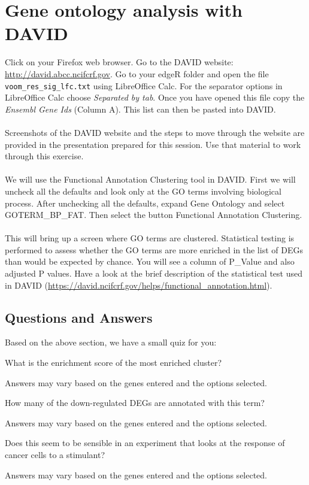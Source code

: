 \section{Gene ontology analysis with DAVID}
Click on your Firefox web browser. Go to the DAVID website: \url{http://david.abcc.ncifcrf.gov}. Go to your edgeR folder and open the file \texttt{voom\_res\_sig\_lfc.txt} using LibreOffice Calc. For the separator options in LibreOffice Calc choose \emph{Separated by tab}. Once you have opened this file copy the \emph{Ensembl Gene Ids} (Column A). This list can then be pasted into DAVID.\\\\
Screenshots of the DAVID website and the steps to move through the website are provided in the presentation prepared for this session. Use that material to work through this exercise.\\\\
We will use the Functional Annotation Clustering tool in DAVID. First we will uncheck all the defaults and look only at the GO terms involving biological process. After unchecking all the defaults, expand Gene Ontology and select GOTERM\_BP\_FAT. Then select the button Functional Annotation Clustering. \\\\
This will bring up a screen where GO terms are clustered.  Statistical testing is performed to assess whether the GO terms are more enriched in the list of DEGs than would be expected by chance. You will see a column of P\_Value and also adjusted P values.  Have a look at the brief description of the statistical test used in DAVID (\url{https://david.ncifcrf.gov/helps/functional_annotation.html}).

\subsection{Questions and Answers}
Based on the above section, we have a small quiz for you:
\begin{questions}
What is the enrichment score of the most enriched cluster?
\begin{answer}
Answers may vary based on the genes entered and the options selected.
\end{answer}
How many of the down-regulated DEGs are annotated with this term? 
\begin{answer}
Answers may vary based on the genes entered and the options selected.
\end{answer}
Does this seem to be sensible in an experiment that looks at the response of cancer cells to a stimulant?
\begin{answer}
Answers may vary based on the genes entered and the options selected.
\end{answer}
\end{questions}
